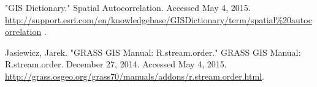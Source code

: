 \documentclass[twoside]{article}
\begin{document}
\begin{multicols}{2}
\begin{thebibliography}{100}
\newblock "GIS Dictionary." Spatial Autocorrelation. Accessed May 4, 2015. \url{http://support.esri.com/en/knowledgebase/GISDictionary/term/spatial\%20autocorrelation} .


\newblock Jasiewicz, Jarek. "GRASS GIS Manual: R.stream.order." GRASS GIS Manual: R.stream.order. December 27, 2014. Accessed May 4, 2015. \url{http://grass.osgeo.org/grass70/manuals/addons/r.stream.order.html}.

\end{thebibliography}



\end{multicols}
\end{document}
